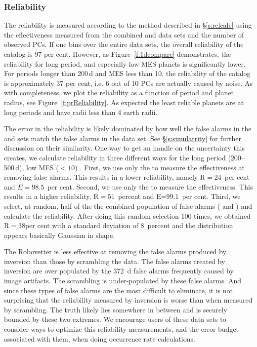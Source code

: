 \subsubsection{Reliability}
\label{s:reliability}
The reliability is measured according to the method described in \S\ref{s:relcalc} using the effectiveness measured from the combined \scrtce{} and \invtce{} data sets and the number of observed PCs.  If one bins over the entire data sets, the overall reliability of the catalog is 97 per cent. However, as Figure~\ref{f:1dcompare} demonstrates, the reliability for long period, and especially low MES planets is significantly lower.  For periods longer than 200\,d and MES less than 10, the reliability of the catalog is approximately 37 per cent, i.e. 6 out of 10 PCs are actually caused by noise. As with completeness, we plot the reliability as a function of period and planet radius, see Figure~\ref{f:prReliability}. As expected the least reliable planets are at long periods and have radii less than 4 earth radii. 

The error in the reliability is likely dominated by how well the false alarms in the \scrtce{} and \invtce{} sets match the false alarms in the \opstce{} data set. See \S\ref{s:simulatrity} for further discussion on their similarity.  One way to get an handle on the uncertainty this creates, we calculate reliability in three different ways for the long period (200--500\,d), low MES ($<10$) .  First, we use only the  to measure the effectiveness at removing false alarms. This results in a lower reliability, namely R$=24$~per cent and $E=98.5$~per cent. Second, we use only the  to measure the effectiveness. This results in a higher reliability, R$=51$~percent and E=$99.1$~per cent. Third, we select, at random, half of the the combined population of false alarms (\scrtce{} and \invtce{}) and calculate the reliability. After doing this random selection 100 times, we obtained R$=38$per cent with a standard deviation of 8~percent and the distribution appears basically Gaussian in shape.  

The Robovetter is less effective at removing the false alarms produced by inversion than those by scrambling the data. The false alarms created by inversion are over populated by the 372~d false alarms frequently caused by image artifacts.  The scrambling is under-populated by these false alarms. And since these types of false alarms are the most difficult to eliminate, it is not surprising that the reliability measured by inversion is worse than when measured by scrambling.  The truth likely lies somewhere in between and is securely bounded by these two extremes. We encourage users of these data sets to consider ways to optimize this reliability measurements, and the error budget associated with them, when doing occurrence rate calculations. 



